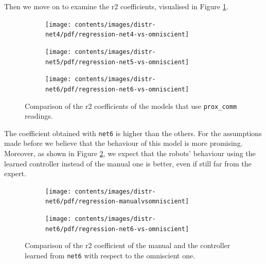 Then we move on to examine the \gls{r2} coefficients, visualised in Figure 
\ref{fig:net456r2}.
\begin{figure}[!htb]
	\begin{center}
		\begin{subfigure}[h]{0.47\textwidth}
			\texttt{[image: contents/images/distr-net4/pdf/regression-net4-vs-omniscient]}%
		\end{subfigure}
		\hfill\vspace{-0.5cm}
		\begin{subfigure}[h]{0.47\textwidth}
			\texttt{[image: contents/images/distr-net5/pdf/regression-net5-vs-omniscient]}%
		\end{subfigure}
	\end{center}
	\begin{center}
		\begin{subfigure}[h]{0.47\textwidth}
			\texttt{[image: contents/images/distr-net6/pdf/regression-net6-vs-omniscient]}
		\end{subfigure}
	\end{center}
	\caption[Comparison of the \gls{r2} coefficients for \texttt{prox\_comm} 
	readings.]{Comparison of the \gls{r2} coefficients of the models that use 
	\texttt{prox\_comm} readings.}
	\label{fig:net456r2}
\end{figure}
The coefficient obtained with \texttt{net6} is higher than the others. For the 
assumptions made before we believe that the behaviour of this model is more 
promising. Moreover, as shown in Figure \ref{fig:net6r2}, we expect that the 
robots’ behaviour using the learned controller instead of the manual one is 
better, even if still far from the expert.

\begin{figure}[!htb]
	\centering
	\begin{subfigure}[h]{0.49\textwidth}
		\centering
		\texttt{[image: contents/images/distr-net6/pdf/regression-manualvsomniscient]}%
	\end{subfigure}
	\hfill
	\begin{subfigure}[h]{0.49\textwidth}
		\centering
		\texttt{[image: contents/images/distr-net6/pdf/regression-net6-vs-omniscient]}
	\end{subfigure}
	\caption[Evaluation of the \gls{r2} coefficients of \texttt{net6} 
	.]{Comparison of 
	the \gls{r2} coefficient of the manual and the controller 
	learned from \texttt{net6} with respect to the omniscient one.}
	\label{fig:net6r2}
\end{figure}

